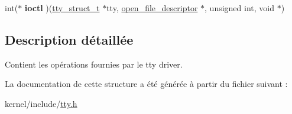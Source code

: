 \begin{DoxyCompactItemize}
\item 
\hypertarget{struct__tty__operations__t_a0d583c140c5fcf8896c42b571be2d2cb}{int($\ast$ {\bfseries ioctl} )(\hyperlink{tty_8h_a0870504b9f2d2e99a669e6df3dc9e84e}{tty\-\_\-struct\-\_\-t} $\ast$tty, \hyperlink{struct__open__file__descriptor}{open\-\_\-file\-\_\-descriptor} $\ast$, unsigned int, void $\ast$)}\label{struct__tty__operations__t_a0d583c140c5fcf8896c42b571be2d2cb}

\end{DoxyCompactItemize}


\subsection{\-Description détaillée}
\-Contient les opérations fournies par le tty driver. 

\-La documentation de cette structure a été générée à partir du fichier suivant \-:\begin{DoxyCompactItemize}
\item 
kernel/include/\hyperlink{tty_8h}{tty.\-h}\end{DoxyCompactItemize}
